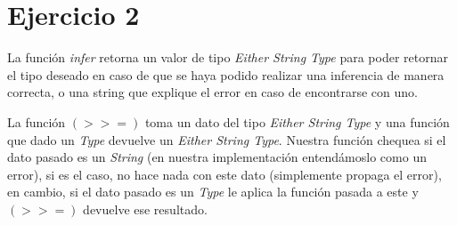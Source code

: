 \documentclass[11pt]{article}
\begin{document}
\section*{Ejercicio 2}

La función \textit{infer} retorna un valor de tipo \textit{Either String Type} para poder retornar el tipo deseado en caso de que se haya podido realizar una inferencia de manera correcta, o una string que explique el error en caso de encontrarse con uno. 

La función $(>>=)$ toma un dato del tipo \textit{Either String Type} y una función que dado un \textit{Type} devuelve un \textit{Either String Type}. Nuestra función chequea si el dato pasado es un \textit{String} (en nuestra implementación entendámoslo como un error), si es el caso, no hace nada con este dato (simplemente propaga el error), en cambio, si el dato pasado es un \textit{Type} le aplica la función pasada a este y $(>>=)$ devuelve ese resultado.
\end{document}
